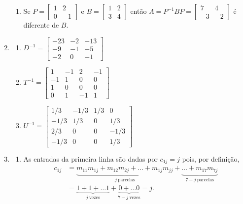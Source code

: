 \documentclass[12pt,a4paper]{article}
\begin{document}
\begin{enumerate}
\begin{enumerate}
\item Se $P =
\begin{bmatrix}
1 & 2 \\
0 & -1
\end{bmatrix}$ e $B =
\begin{bmatrix}
1 & 2 \\
3 & 4
\end{bmatrix}$
então $A = P ^{-1}BP = \begin{bmatrix}
7 & 4 \\
-3 & -2
\end{bmatrix}$ é diferente de $B$.
\end{enumerate}

\item \begin{enumerate}
\item
$D^{-1} = \begin{bmatrix}
-23& -2& -13\\
 -9& -1& -5\\
 -2&  0& -1
\end{bmatrix}$
\item
$T^{-1} = \begin{bmatrix}
 1& -1&  2& -1\\
-1&  1&  0&  0\\
 1&  0&  0&  0\\
 0&  1& -1&  1
\end{bmatrix}$
\item
$U^{-1} = \begin{bmatrix}
 1/3& -1/3& 1/3&    0\\
-1/3&  1/3&   0&  1/3\\
 2/3&    0&   0& -1/3\\
-1/3&    0&   0&  1/3
\end{bmatrix}$
\end{enumerate}

\item \begin{enumerate}
\item
As entradas da primeira linha são dadas por $c_{1j} = j$ pois, por definição,
\begin{align*}
c_{1j} & = \underbrace{m_{11}m_{1j} + m_{12}m_{2j} + \ldots + m_{1j}m_{jj}}_{j\ \text{parcelas}} + \underbrace{\ldots + m_{17}m_{7j}}_{7-j\ \text{parcelas}} \\
       & =\underbrace{1 + 1 + \ldots 1}_{j\ \text{vezes}} + \underbrace{0 + \ldots 0}_{7-j\ \text{vezes}} = j.
\end{align*}


\end{enumerate}
\end{enumerate}
\end{document}
